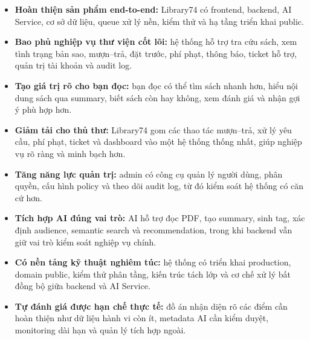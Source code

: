 \begin{itemize}
    \item \textbf{Hoàn thiện sản phẩm end-to-end:} Library74 có frontend,
    backend, AI Service, cơ sở dữ liệu, queue xử lý nền, kiểm thử và hạ tầng
    triển khai public.

    \item \textbf{Bao phủ nghiệp vụ thư viện cốt lõi:} hệ thống hỗ trợ tra cứu
    sách, xem tình trạng bản sao, mượn--trả, đặt trước, phí phạt, thông báo,
    ticket hỗ trợ, quản trị tài khoản và audit log.

    \item \textbf{Tạo giá trị rõ cho bạn đọc:} bạn đọc có thể tìm sách nhanh
    hơn, hiểu nội dung sách qua summary, biết sách còn hay không, xem đánh giá
    và nhận gợi ý phù hợp hơn.

    \item \textbf{Giảm tải cho thủ thư:} Library74 gom các thao tác mượn--trả,
    xử lý yêu cầu, phí phạt, ticket và dashboard vào một hệ thống thống nhất,
    giúp nghiệp vụ rõ ràng và minh bạch hơn.

    \item \textbf{Tăng năng lực quản trị:} admin có công cụ quản lý người dùng,
    phân quyền, cấu hình policy và theo dõi audit log, từ đó kiểm soát hệ thống
    có căn cứ hơn.

    \item \textbf{Tích hợp AI đúng vai trò:} AI hỗ trợ đọc PDF, tạo summary,
    sinh tag, xác định audience, semantic search và recommendation, trong khi
    backend vẫn giữ vai trò kiểm soát nghiệp vụ chính.

    \item \textbf{Có nền tảng kỹ thuật nghiêm túc:} hệ thống có triển khai
    production, domain public, kiểm thử phân tầng, kiến trúc tách lớp và cơ chế
    xử lý bất đồng bộ giữa backend và AI Service.

    \item \textbf{Tự đánh giá được hạn chế thực tế:} đồ án nhận diện rõ các điểm
    cần hoàn thiện như dữ liệu hành vi còn ít, metadata AI cần kiểm duyệt,
    monitoring dài hạn và quản lý tích hợp ngoài.
\end{itemize}

